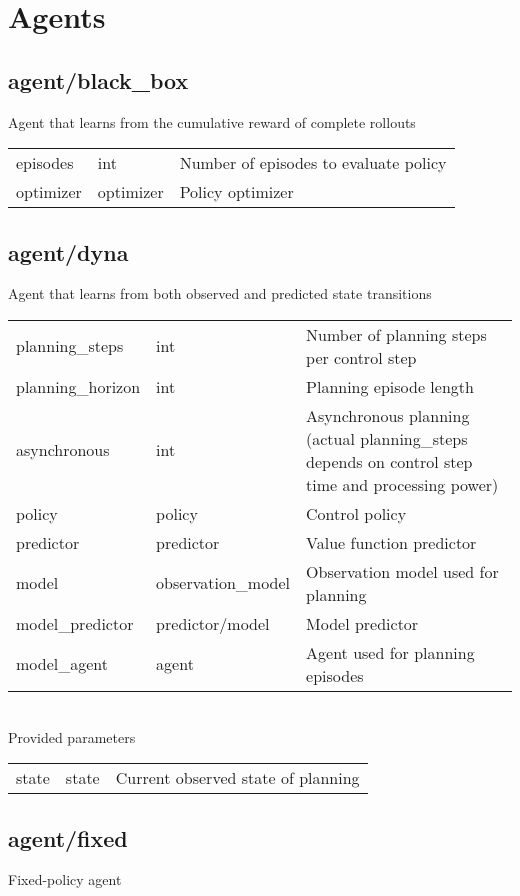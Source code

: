 \section{Agents}
\subsection{agent/black\_box}
\noindent Agent that learns from the cumulative reward of complete rollouts\\

\noindent\begin{tabular}{@{}lll@{}}
episodes&int&Number of episodes to evaluate policy\\
optimizer&optimizer&Policy optimizer\\
\end{tabular}
\subsection{agent/dyna}
\noindent Agent that learns from both observed and predicted state transitions\\

\noindent\begin{tabular}{@{}lll@{}}
planning\_steps&int&Number of planning steps per control step\\
planning\_horizon&int&Planning episode length\\
asynchronous&int&Asynchronous planning (actual planning\_steps depends on control step time and processing power)\\
policy&policy&Control policy\\
predictor&predictor&Value function predictor\\
model&observation\_model&Observation model used for planning\\
model\_predictor&predictor/model&Model predictor\\
model\_agent&agent&Agent used for planning episodes\\
\end{tabular}
\\

\noindent Provided parameters\\

\noindent\begin{tabular}{@{}lll@{}}
state&state&Current observed state of planning\\
\end{tabular}
\subsection{agent/fixed}
\noindent Fixed-policy agent\\

